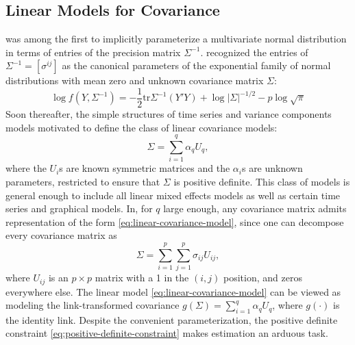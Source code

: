 \bigskip





\bigskip

\subsection{Linear Models for Covariance}
\cite{gabriel1962ante} was among the first to implicitly parameterize a multivariate normal distribution in terms of entries of the precision matrix $\Sigma^{-1}$.  \cite{dempster1972covariance} recognized the entries of $\Sigma^{-1} = \left[\sigma^{ij} \right]$ as the canonical parameters of the exponential family of normal distributions with mean zero and unknown covariance matrix $\Sigma$:
\[
\log f\left(Y, \Sigma^{-1}\right) = -\frac{1}{2}\mbox{tr}\Sigma^{-1} \left(Y'Y\right) + \log\vert \Sigma \vert^{-1/2} - p \log\sqrt{\pi}
\]
Soon thereafter, the simple structures of time series and variance components models motivated \cite{anderson1973asymptotically} to define the class of linear covariance models:
\begin{equation}\label{eq:linear-covariance-model}
\Sigma = \sum_{i = 1}^q \alpha_qU_q,
\end{equation}
\noindent
where the $U_i$s are known symmetric matrices and the $\alpha_i$s are unknown parameters, restricted to ensure that $\Sigma$ is positive definite. This class of models is general enough to include all linear mixed effects models as well as certain time series and graphical models. In, for $q$ large enough, any covariance matrix admits representation of the form \eqref{eq:linear-covariance-model}, since one can decompose every covariance matrix as 
\begin{equation} \label{eq:linear-covariance-model-2}	
\Sigma = \sum_{i = 1}^p \sum_{j = 1}^p \sigma_{ij} U_{ij},
\end{equation}
\noindent
where $U_{ij}$ is an $p \times p$ matrix with a 1 in the $\left(i,j\right)$ position, and zeros everywhere else. The linear model \eqref{eq:linear-covariance-model} can be viewed as modeling the link-transformed covariance $g\left(\Sigma\right) =\sum_{i = 1}^q \alpha_qU_q$, where $g\left(\cdot\right)$ is the identity link. Despite the convenient parameterization, the positive definite constraint \eqref{eq:positive-definite-constraint} makes estimation an arduous task. 

